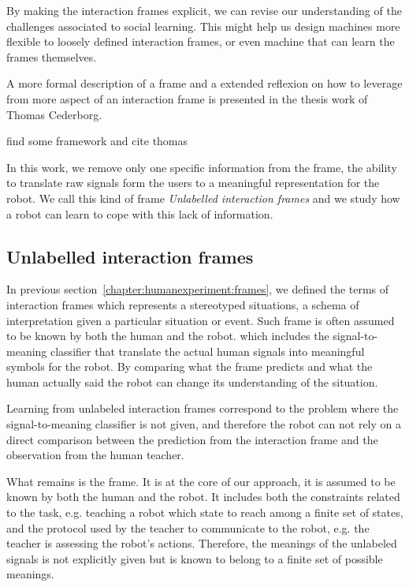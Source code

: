 By making the interaction frames explicit, we can revise our understanding of the challenges associated to social learning. This might help us design machines more flexible to loosely defined interaction frames, or even machine that can learn the frames themselves.

A more formal description of a frame and a extended reflexion on how to leverage from more aspect of an interaction frame is presented in the thesis work of Thomas Cederborg. 


find some framework and cite thomas \cite{cederborg2013language}



In this work, we remove only one specific information from the frame, the ability to translate raw signals form the users to a meaningful representation for the robot. We call this kind of frame \emph{Unlabelled interaction frames} and we study how a robot can learn to cope with this lack of information. 

\subsection{Unlabelled interaction frames}

In previous section~\ref{chapter:humanexperiment:frames}, we defined the terms of interaction frames which represents a stereotyped situations, a schema of interpretation given a particular situation or event. Such frame is often assumed to be known by both the human and the robot.  which includes the signal-to-meaning classifier that translate the actual human signals into meaningful symbols for the robot. By comparing what the frame predicts and what the human actually said the robot can change its understanding of the situation.

Learning from unlabeled interaction frames correspond to the problem where the signal-to-meaning classifier is not given, and therefore the robot can not rely on a direct comparison between the prediction from the interaction frame and the observation from the human teacher.

What remains is the frame. It is at the core of our approach, it is assumed to be known by both the human and the robot. It includes both the constraints related to the task, e.g. teaching a robot which state to reach among a finite set of states, and the protocol used by the teacher to communicate to the robot, e.g. the teacher is assessing the robot's actions. Therefore, the meanings of the unlabeled signals is not explicitly given but is known to belong to a finite set of possible meanings.

